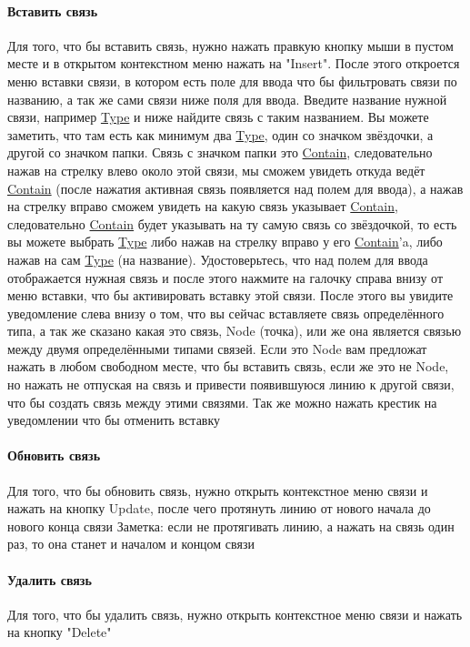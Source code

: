 \documentclass{article}
\begin{document}
\paragraph{Вставить связь}
Для того, что бы вставить связь, нужно нажать правкую кнопку мыши в пустом
месте и в открытом контекстном меню нажать на "Insert". После этого откроется
меню вставки связи, в котором есть поле для ввода что бы фильтровать связи по
названию, а так же сами связи ниже поля для ввода. Введите название нужной
связи, например \hyperlink{type.Def}{Type} и ниже найдите связь с таким
названием. Вы можете
заметить, что там есть как минимум два \hyperlink{type.Def}{Type}, один со
значком звёздочки, а
другой со значком папки. Связь с значком папки это \hyperlink{Contain.Def}{Contain}, следовательно нажав
на стрелку влево около этой связи, мы сможем увидеть откуда ведёт \hyperlink{Contain.Def}{Contain}
(после нажатия активная связь появляется над полем для ввода), а нажав на
стрелку вправо сможем увидеть на какую связь указывает \hyperlink{Contain.Def}{Contain}, следовательно
\hyperlink{Contain.Def}{Contain} будет указывать на ту самую связь со звёздочкой, то есть вы можете
выбрать \hyperlink{type.Def}{Type} либо нажав на стрелку вправо у его
\hyperlink{Contain.Def}{Contain}'a, либо нажав на сам
\hyperlink{type.Def}{Type} (на название). Удостоверьтесь, что над полем для
ввода отображается нужная
связь и после этого нажмите на галочку справа внизу от меню вставки, что бы
активировать вставку этой связи. После этого вы увидите уведомление слева внизу
о том, что вы сейчас вставляете связь определённого типа, а так же сказано
какая это связь, Node (точка), или же она является связью между двумя
определёнными типами связей. Если это Node вам предложат нажать в любом
свободном месте, что бы вставить связь, если же это не Node, но нажать не
отпуская на связь и привести появившуюся линию к другой связи, что бы создать
связь между этими связями. Так же можно нажать крестик на уведомлении что бы
отменить вставку
\paragraph{Обновить связь}
Для того, что бы обновить связь, нужно открыть контекстное меню связи и нажать
на кнопку Update, после чего протянуть линию от нового начала до нового конца
связи
Заметка: если не протягивать линию, а нажать на связь один раз, то она станет и
началом и концом связи
\paragraph{Удалить связь}
Для того, что бы удалить связь, нужно открыть контекстное меню связи и нажать
на кнопку "Delete"
\end{document}
